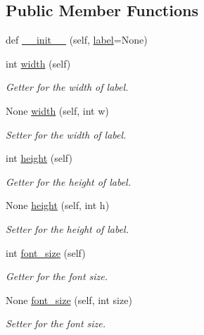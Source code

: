 \subsection*{Public Member Functions}
\begin{DoxyCompactItemize}
\item 
def \mbox{\hyperlink{classbridges_1_1label_1_1_label_a9a6a9ba4ccb2757f0577d741d730c95c}{\+\_\+\+\_\+init\+\_\+\+\_\+}} (self, \mbox{\hyperlink{classbridges_1_1symbol_1_1_symbol_a94be85f7ec433b5ac577ca12753fa911}{label}}=None)
\item 
int \mbox{\hyperlink{classbridges_1_1label_1_1_label_a69c94eba378b7c10745463354982e54d}{width}} (self)
\begin{DoxyCompactList}\small\item\em Getter for the width of label. \end{DoxyCompactList}\item 
None \mbox{\hyperlink{classbridges_1_1label_1_1_label_ab3fb90af5f83440eb79434422f63cb5c}{width}} (self, int w)
\begin{DoxyCompactList}\small\item\em Setter for the width of label. \end{DoxyCompactList}\item 
int \mbox{\hyperlink{classbridges_1_1label_1_1_label_a7223de49f9e74d5c27eaf3d958c3bb30}{height}} (self)
\begin{DoxyCompactList}\small\item\em Getter for the height of label. \end{DoxyCompactList}\item 
None \mbox{\hyperlink{classbridges_1_1label_1_1_label_aff85fe5d53c73ba12851145f4771c02f}{height}} (self, int h)
\begin{DoxyCompactList}\small\item\em Setter for the height of label. \end{DoxyCompactList}\item 
int \mbox{\hyperlink{classbridges_1_1label_1_1_label_aad034d601eefef042451587028123668}{font\+\_\+size}} (self)
\begin{DoxyCompactList}\small\item\em Getter for the font size. \end{DoxyCompactList}\item 
None \mbox{\hyperlink{classbridges_1_1label_1_1_label_a56c3981068c522777f73e57fcd111c58}{font\+\_\+size}} (self, int size)
\begin{DoxyCompactList}\small\item\em Setter for the font size. \end{DoxyCompactList}\item 

\end{DoxyCompactItemize}

